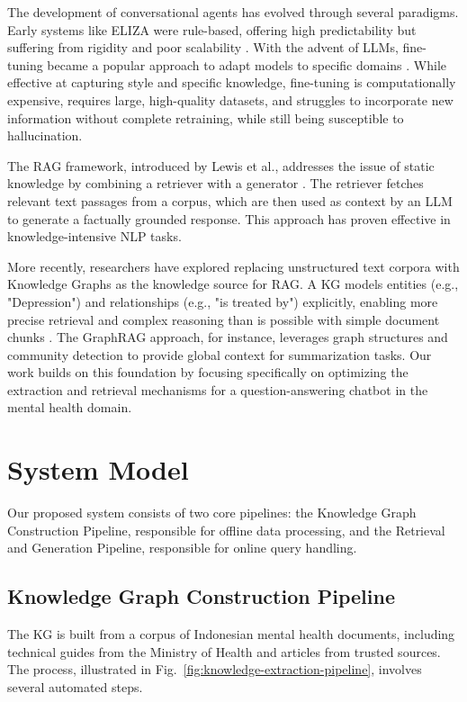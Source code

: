 \documentclass[conference]{IEEEtran}
\begin{document}
The development of conversational agents has evolved through several paradigms.
Early systems like ELIZA were rule-based, offering high predictability but suffering from rigidity and poor scalability \cite{Weizenbaum1966ELIZA}.
With the advent of LLMs, fine-tuning became a popular approach to adapt models to specific domains \cite{yu2024FineTuneOnMentalHealthChatbotExperimental}.
While effective at capturing style and specific knowledge, fine-tuning is computationally expensive, requires large, high-quality datasets, and struggles to incorporate new information without complete retraining, while still being susceptible to hallucination.

The RAG framework, introduced by Lewis et al., addresses the issue of static knowledge by combining a retriever with a generator \cite{Lewis2021RAGKnowledgeIntensiveNLP}.
The retriever fetches relevant text passages from a corpus, which are then used as context by an LLM to generate a factually grounded response.
This approach has proven effective in knowledge-intensive NLP tasks.

More recently, researchers have explored replacing unstructured text corpora with Knowledge Graphs as the knowledge source for RAG. A KG models entities (e.g., "Depression") and relationships (e.g., "is treated by") explicitly, enabling more precise retrieval and complex reasoning than is possible with simple document chunks \cite{Edge2025LocalGlobalGraphRAG}.
The GraphRAG approach, for instance, leverages graph structures and community detection to provide global context for summarization tasks.
Our work builds on this foundation by focusing specifically on optimizing the extraction and retrieval mechanisms for a question-answering chatbot in the mental health domain.

\section{System Model}
Our proposed system consists of two core pipelines: the Knowledge Graph Construction Pipeline, responsible for offline data processing, and the Retrieval and Generation Pipeline, responsible for online query handling.

\subsection{Knowledge Graph Construction Pipeline}
The KG is built from a corpus of Indonesian mental health documents, including technical guides from the Ministry of Health and articles from trusted sources.
The process, illustrated in Fig.~\ref{fig:knowledge-extraction-pipeline}, involves several automated steps.
\end{document}
